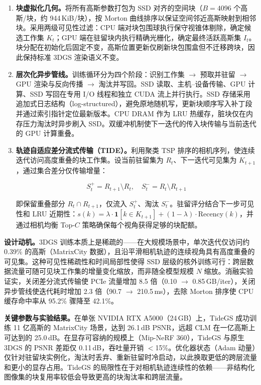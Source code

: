\begin{enumerate}
\item \textbf{块虚拟化几何。}将所有高斯参数打包为 SSD 对齐的空间块（$B=4096$ 个高斯/块，约 944\,KiB/块），按 Morton 曲线排序以保证空间邻近高斯映射到相邻块。采用两级可见性过滤：CPU 端对块包围球执行保守视锥体剔除，确定候选工作集 $K_t$；GPU 端在驻留块内执行精确光栅化，确定最终活跃高斯集 $I_t$。块分配在初始化后固定不变，高斯位置更新仅刷新块包围盒但不迁移跨块，因此保持标准 3DGS 渲染语义不变。

\item \textbf{层次化异步管线。}训练循环分为四个阶段：识别工作集 $\to$ 预取并驻留 $\to$ GPU 渲染与反向传播 $\to$ 淘汰并写回。SSD 读取、主机--设备传输、GPU 计算、SSD 写回在专用 I/O 线程和独立 CUDA 流上并行执行。SSD 存储采用追加式日志结构（log-structured），避免原地随机写，更新块顺序写入补丁段并通过索引指针定位最新版本。CPU DRAM 作为 LRU 热缓存，脏块仅在内存压力淘汰时异步刷入 SSD。双缓冲机制使下一迭代的传入块传输与当前迭代的 GPU 计算重叠。

\item \textbf{轨迹自适应差分流式传输（TIDE）。}利用聚类 TSP 排序的相机序列，使连续迭代访问高度重叠的块工作集。设当前驻留集为 $R_t$、下一迭代可见集为 $K_{t+1}$，通过集合差分仅传输增量：

\begin{equation}
S_t^{+} = R_{t+1} \setminus R_t, \quad S_t^{-} = R_t \setminus R_{t+1}
\end{equation}

即保留重叠部分 $R_t \cap R_{t+1}$，仅流入 $S_t^{+}$、淘汰 $S_t^{-}$。驻留评分结合下一步可见性和 LRU 近期性：$s(k) = \lambda \cdot \mathbf{1}[k \in K_{t+1}] + (1-\lambda) \cdot \mathrm{Recency}(k)$，并通过相机均衡 Top-$C$ 策略确保每个视角获得足够的块配额。
\end{enumerate}

\textbf{设计动机。}3DGS 训练本质上是稀疏的——在大规模场景中，单次迭代仅访问约 0.39\% 的高斯（MatrixCity 数据），且沿平滑相机轨迹的连续视角具有高度重叠的可见集。这种可见性稀疏性和时间局部性使得 SSD 层级的核外训练可行：跨层数据流量可随可见块工作集的增量变化缩放，而非随全模型规模 $N$ 缩放。消融实验证实，关闭差分流式传输使 PCIe 流量增加 8.5 倍（0.10 $\to$ 0.85\,GB/iter），关闭异步管线使迭代耗时增加 2.3 倍（90.7 $\to$ 210.5\,ms），去除 Morton 排序使 CPU 缓存命中率从 95.2\% 骤降至 42.1\%。

\textbf{关键参数与实验结果。}在单张 NVIDIA RTX A5000（24\,GB）上，TideGS 成功训练 11 亿高斯的 MatrixCity 场景，达到 26.1\,dB PSNR，远超 CLM 在一亿高斯上可达到的 25.0\,dB。在显存可容纳的规模上（Mip-NeRF 360），TideGS 与原生 3DGS 的 PSNR 差距仅 0.11\,dB，吞吐量开销 $<$15\%。优化器状态（Adam 动量）仅针对驻留块实例化，淘汰时丢弃、重新驻留时冷启动，以此换取更低的跨层流量和更小的显存占用。TideGS 的局限性在于对相机轨迹连续性的依赖——非结构化图像集的块复用率较低会导致更高的块淘汰率和跨层流量。


